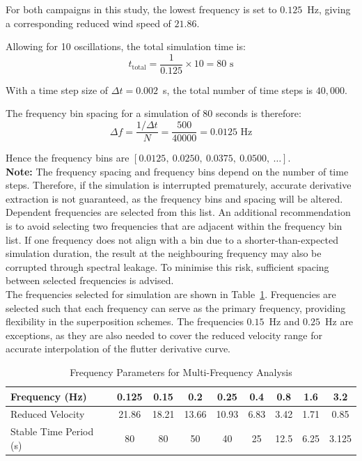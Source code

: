 \documentclass[../main]{subfiles}
\begin{document}
For both campaigns in this study, the lowest frequency is set to $0.125$~Hz, 
giving a corresponding reduced wind speed of $21.86$.

Allowing for 10 oscillations, the total simulation time is:
\begin{equation}
    t_{\text{total}} = \frac{1}{0.125} \times 10 = 80 \text{ s}
\end{equation}

With a time step size of $\Delta t = 0.002$~s, the total number of time steps is $40{,}000$.

The frequency bin spacing for a simulation of 80 seconds is therefore:
\begin{equation}
    \Delta f = \frac{1/\Delta t}{N} = \frac{500}{40000} = 0.0125 \text{ Hz}
\end{equation}

Hence the frequency bins are $[0.0125,\ 0.0250,\ 0.0375,\ 0.0500,\ \ldots]$.\\

\textbf{Note:} The frequency spacing and frequency bins depend on the number of time steps. Therefore, if the simulation 
is interrupted prematurely, accurate derivative extraction is not guaranteed, as the frequency bins and 
spacing will be altered.\\

Dependent frequencies are selected from this list. An additional recommendation is to avoid selecting 
two frequencies that are adjacent within the frequency bin list. If one frequency does not 
align with a bin due to a shorter-than-expected simulation duration, the result at the 
neighbouring frequency may also be corrupted through spectral leakage. To minimise this risk, 
sufficient spacing between selected frequencies is advised.\\

The frequencies selected for simulation are shown in Table~\ref{tab:frequencies}. 
Frequencies are selected such that each frequency can serve as the primary frequency, 
providing flexibility in the superposition schemes. The frequencies $0.15$~Hz and $0.25$~Hz are exceptions, 
as they are also needed to cover the reduced velocity range for accurate interpolation of the 
flutter derivative curve.

\begin{table}[htbp]
\centering
\caption{Frequency Parameters for Multi-Frequency Analysis}
\label{tab:frequencies}
\begin{tabular}{|l|cccccccc|}
\hline
\textbf{Frequency (Hz)} & 0.125 & 0.15 & 0.2 & 0.25 & 0.4 & 0.8 & 1.6 & 3.2 \\
\hline
Reduced Velocity        & 21.86 & 18.21 & 13.66 & 10.93 & 6.83 & 3.42 & 1.71 & 0.85 \\
Stable Time Period (s)  & 80    & 80    & 50    & 40    & 25   & 12.5 & 6.25 & 3.125 \\
\bottomrule
\end{tabular}
\end{table}
\end{document}
